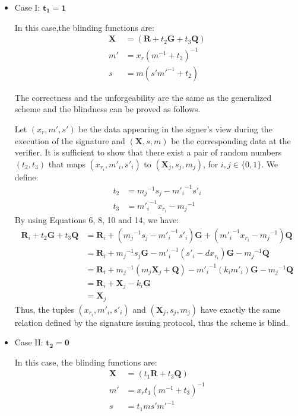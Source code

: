 \documentclass[journal,onecolumn,draftcls]{IEEEtran}
\begin{document}
\begin{itemize}
	\item Case I: $\mathbf{t_1=1}$
	
	In this case,the blinding functions are:
	\begin{align}
		\textbf{X} &= (\textbf{R}+t_2 \textbf{G}+t_3 \textbf{Q}) \nonumber \\
		m'&= x_r (m^{-1}+t_3 )^{-1} \nonumber \\
		s &=m(s'm'^{-1}+t_2 )
	\end{align}
	
	The correctness and the unforgeability are the same as the generalized scheme and the blindness can be proved as follows.
	
	Let $(x_r,m',s')$ be the data appearing in the signer's view during the execution of the signature and $(\textbf{X},s,m)$ be the corresponding data at the verifier. It is sufficient to show that there exist a pair of random numbers $(t_2,t_3)$ that maps $(x_{r_i},m'_i,s'_i )$ to $(\textbf{X}_j,s_j,m_j )$, for $i,j\in\{0,1\}$. We define:
	\begin{align}
		t_2 &= {m_j}^{-1}s_j-{m'_i}^{-1}s'_i \nonumber \\
		t_3 &= {m'_i}^{-1}x_{r_i}-{m_j}^{-1}
	\end{align}
By using Equations 6, 8, 10 and 14, we have:
\begin{align}
\textbf{R}_i+t_2 \textbf{G}+t_3 \textbf{Q} &= \textbf{R}_i+({m_j}^{-1} s_j-{m'_i}^{-1}s'_i)\textbf{G}+({m'_i}^{-1}x_{r_i}-{m_j}^{-1} )\textbf{Q} \nonumber \\
	&=\textbf{R}_i+{m_j}^{-1}s_j\textbf{G}-{m'_i}^{-1} (s'_i-dx_{r_i} )\textbf{G}-{m_j}^{-1} \textbf{Q} \nonumber \\
	&=\textbf{R}_i+{m_j}^{-1} (m_j \textbf{X}_j+\textbf{Q})-{m'_i}^{-1} (k_i m'_i )\textbf{G}-{m_j}^{-1} \textbf{Q} \nonumber \\
	&=\textbf{R}_i+\textbf{X}_j-k_i \textbf{G} \nonumber \\
	&=\textbf{X}_j 
\end{align}
Thus, the tuples $(x_{r_i},m'_i,s'_i )$ and $(\textbf{X}_j,s_j,m_j )$ have exactly the same relation defined by the signature issuing protocol, thus the scheme is blind.

	\item Case II: $\mathbf{t_2=0}$
	
	In this case, the blinding functions are:
	\begin{align}
		\textbf{X} &=(t_1 \textbf{R}+t_3 \textbf{Q}) \nonumber \\
		m' &=x_r t_1 (m^{-1}+t_3 )^{-1} \nonumber \\
		s &=t_1ms'm'^{-1}
	\end{align}
	

\end{itemize}
\end{document}
